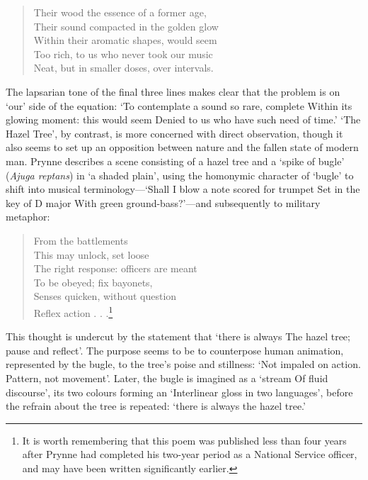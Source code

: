 \documentclass[]{article}
\begin{document}
\begin{quote}
\singlespacing Their wood the essence of a former age,\\
Their sound compacted in the golden glow\\
Within their aromatic shapes, would seem\\
Too rich, to us who never took our music\\
Neat, but in smaller doses, over intervals.
\end{quote}

\noindent The lapsarian tone of the final three lines makes clear that
the problem is on ‘our’ side of the equation: ‘To contemplate a sound so
rare, complete \textbar{} Within its glowing moment: this would seem
\textbar{} Denied to us who have such need of time.’ ‘The Hazel Tree’,
by contrast, is more concerned with direct observation, though it also
seems to set up an opposition between nature and the fallen state of
modern man. Prynne describes a scene consisting of a hazel tree and a
‘spike of bugle’ (\emph{Ajuga reptans}) in ‘a shaded plain’, using the
homonymic character of ‘bugle’ to shift into musical terminology—‘Shall
I blow a note scored for trumpet \textbar{} Set in the key of D major
\textbar{} With green ground-bass?’—and subsequently to military
metaphor:

\begin{quote}
\singlespacing From the battlements\\
This may unlock, set loose\\
The right response: officers are meant\\
To be obeyed; fix bayonets,\\
Senses quicken, without question\\
Reflex action . . .\footnote{It is worth remembering that this poem was
  published less than four years after Prynne had completed his two-year
  period as a National Service officer, and may have been written
  significantly earlier.}
\end{quote}

\noindent This thought is undercut by the statement that ‘there is
always \textbar{} The hazel tree; pause and reflect’. The purpose seems
to be to counterpose human animation, represented by the bugle, to the
tree’s poise and stillness: ‘Not impaled on action. \textbar{} Pattern,
not movement’. Later, the bugle is imagined as a ‘stream \textbar{} Of
fluid discourse’, its two colours forming an ‘Interlinear gloss in two
languages’, before the refrain about the tree is repeated: ‘there is
always the hazel tree.’
\end{document}
